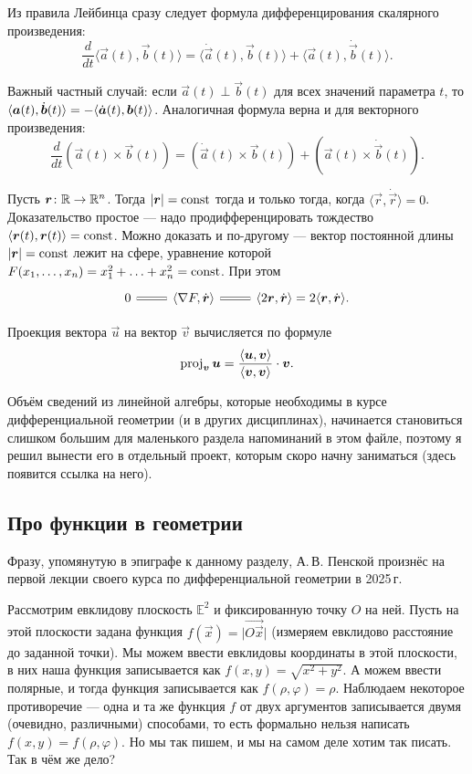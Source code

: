 Из правила Лейбинца сразу следует формула дифференцирования скалярного произведения:
\[
	\frac{d}{dt}\langle \vec{a}(t), \vec{b}(t) \rangle = \langle \dot{\vec{a}}(t), \vec{b}(t) \rangle + \langle \vec{a}(t), \dot{\vec{b}}(t) \rangle.
\]

Важный частный случай: если $\vec{a}(t) \perp \vec{b}(t)$ для всех значений параметра $t$, то $\langle\vec{a}(t), \dot{\vec{b}}(t)\rangle \hm= -\langle\dot{\vec{a}}(t), \vec{b}(t)\rangle$. Аналогичная формула верна и для векторного произведения:
\[
	\frac{d}{dt}(\vec{a}(t) \times \vec{b}(t)) = (\dot{\vec{a}}(t) \times \vec{b}(t)) + (\vec{a}(t) \times \dot{\vec{b}}(t)).
\]

Пусть $\boldsymbol{r}\colon \mathbb{R} \to \mathbb{R}^n$. Тогда $\left\lvert\boldsymbol{r}\right\rvert = \mathrm{const}$ тогда и только тогда, когда $\langle \vec{r}, \dot{\vec{r}} \rangle = 0$. Доказательство простое --- надо продифференцировать тождество $\langle \boldsymbol{r}(t), \boldsymbol{r}(t) \rangle = \mathrm{const}$. Можно доказать и по-другому --- вектор постоянной длины $\left\lvert\boldsymbol{r}\right\rvert = \mathrm{const}$ лежит на сфере, уравнение которой $F(x_1, \ldots, x_n) = x_1^2 + \ldots + x_n^2 = \mathrm{const}$. При этом
\[\begin{tikzcd}
	{0} & {\langle\nabla{F}, \dot{\vec{r}}\rangle} & {\langle 2\vec{r}, \dot{\vec{r}}\rangle = 2\langle\vec{r}, \dot{\vec{r}}\rangle}.
	\arrow[equals, from=1-2, to=1-1]
	\arrow[equals, from=1-2, to=1-3]
\end{tikzcd}\]

Проекция вектора $\vec{u}$ на вектор $\vec{v}$ вычисляется по формуле
\[
	\operatorname{proj}_{\boldsymbol{v}}\boldsymbol{u} = \frac{\langle\boldsymbol{u}, \boldsymbol{v}\rangle}{\langle\boldsymbol{v}, \boldsymbol{v}\rangle} \cdot \boldsymbol{v}.
\]

Объём сведений из линейной алгебры, которые необходимы в курсе дифференциальной геометрии (и в других дисциплинах), начинается становиться слишком большим для маленького раздела напоминаний в этом файле, поэтому я решил вынести его в отдельный проект, которым скоро начну заниматься (здесь появится ссылка на него).

\subsection{Про функции в геометрии}

Фразу, упомянутую в эпиграфе к данному разделу, А.\,В. Пенской произнёс на первой лекции своего курса по дифференциальной геометрии в 2025\,г.

Рассмотрим евклидову плоскость\footnotemark{} $\mathbb{E}^2$ и фиксированную точку $O$ на ней. Пусть на этой плоскости задана функция $f(\vec{x}) = \big|\overrightarrow{O\vec{x}}\big|$ (измеряем евклидово расстояние до заданной точки). Мы можем ввести евклидовы координаты в этой плоскости, в них наша функция записывается как $f(x, y) = \sqrt{x^2 + y^2}$. А можем ввести полярные, и тогда функция записывается как $f(\rho, \varphi) = \rho$. Наблюдаем некоторое противоречие --- одна и та же функция $f$ от двух аргументов записывается двумя (очевидно, различными) способами, то есть формально нельзя написать $f(x, y) = f(\rho, \varphi)$. Но мы так пишем, и мы на самом деле хотим так писать. Так в чём же дело?

